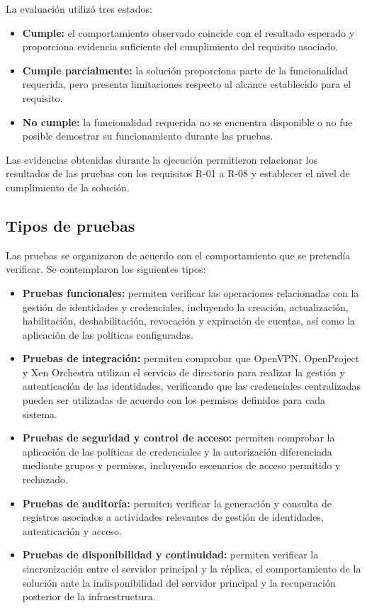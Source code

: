 La evaluación utilizó tres estados:
\begin{itemize}
	\item \textbf{Cumple:} el comportamiento observado coincide con el resultado esperado y proporciona evidencia suficiente del cumplimiento del requisito asociado.
	\item \textbf{Cumple parcialmente:} la solución proporciona parte de la funcionalidad requerida, pero presenta limitaciones respecto al alcance establecido para el requisito.
	\item \textbf{No cumple:} la funcionalidad requerida no se encuentra disponible o no fue posible demostrar su funcionamiento durante las pruebas.
\end{itemize}

Las evidencias obtenidas durante la ejecución permitieron relacionar los resultados de las pruebas con los requisitos R-01 a R-08 y establecer el nivel de cumplimiento de la solución.

\subsection{Tipos de pruebas}
Las pruebas se organizaron de acuerdo con el comportamiento que se pretendía verificar. Se contemplaron los siguientes tipos:
\begin{itemize}
	\item \textbf{Pruebas funcionales:} permiten verificar las operaciones relacionadas con la gestión de identidades y credenciales, incluyendo la creación, actualización, habilitación, deshabilitación, revocación y expiración de cuentas, así como la aplicación de las políticas configuradas.
	\item \textbf{Pruebas de integración:} permiten comprobar que OpenVPN, OpenProject y Xen Orchestra utilizan el servicio de directorio para realizar la gestión y autenticación de las identidades, verificando que las credenciales centralizadas pueden ser utilizadas de acuerdo con los permisos definidos para cada sistema.
	\item \textbf{Pruebas de seguridad y control de acceso:} permiten comprobar la aplicación de las políticas de credenciales y la autorización diferenciada mediante grupos y permisos, incluyendo escenarios de acceso permitido y rechazado.
	\item \textbf{Pruebas de auditoría:} permiten verificar la generación y consulta de registros asociados a actividades relevantes de gestión de identidades, autenticación y acceso.
	\item \textbf{Pruebas de disponibilidad y continuidad:} permiten verificar la sincronización entre el servidor principal y la réplica, el comportamiento de la solución ante la indisponibilidad del servidor principal y la recuperación posterior de la infraestructura.
\end{itemize}

